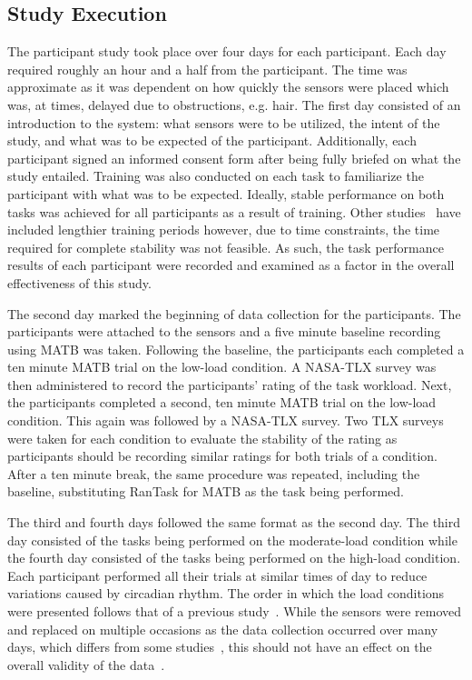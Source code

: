 \documentclass[11pt]{article}
\begin{document}
	\subsection{Study Execution}
	The participant study took place over four days for each participant. Each day required roughly an hour and a half from the participant. The time was approximate as it was dependent on how quickly the sensors were placed which was, at times, delayed due to obstructions, e.g. hair. The first day consisted of an introduction to the system: what sensors were to be utilized, the intent of the study, and what was to be expected of the participant. Additionally, each participant signed an informed consent form after being fully briefed on what the study entailed. Training was also conducted on each task to familiarize the participant with what was to be expected. Ideally, stable performance on both tasks was achieved for all participants as a result of training. Other studies~\cite{Wilson} have included lengthier training periods however, due to time constraints, the time required for complete stability was not feasible. 
	As such, the task performance results of each participant were recorded and examined as a factor in the overall effectiveness of this study. 
		
	The second day marked the beginning of data collection for the participants. The participants were attached to the sensors and a five minute baseline recording using MATB was taken. Following the baseline, the participants each completed a ten minute MATB trial on the low-load condition. A NASA-TLX survey was then administered to record the participants' rating of the task workload. Next, the participants completed a second, ten minute MATB trial on the low-load condition. This again was followed by a NASA-TLX survey. Two TLX surveys were taken for each condition to evaluate the stability of the rating as participants should be recording similar ratings for both trials of a condition. After a ten minute break, the same procedure was repeated, including the baseline, substituting RanTask for MATB as the task being performed.
	
	The third and fourth days followed the same format as the second day. The third day consisted of the tasks being performed on the moderate-load condition while the fourth day consisted of the tasks being performed on the high-load condition. Each participant performed all their trials at similar times of day to reduce variations caused by circadian rhythm. The order in which the load conditions were presented follows that of a previous study~\cite{Wilson}. While the sensors were removed and replaced on multiple occasions as the data collection occurred over many days, which differs from some studies~\cite{Wilson, Ke, Zhang}, this should not have an effect on the overall validity of the data~\cite{Estepp_2015}.
\end{document}
